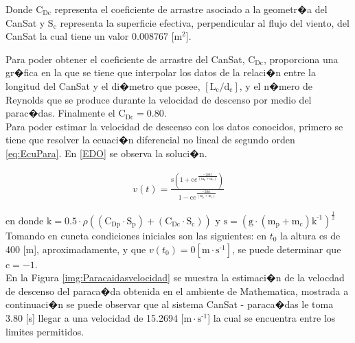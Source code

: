 \documentclass[10pt,a4paper]{book}
\begin{document}
Donde $\text{C}_{\text{Dc}}$ representa el coeficiente de arrastre asociado a la geometr�a del CanSat y $\text{S}_{\text{c}}$ representa la superficie efectiva, perpendicular al flujo del viento, del CanSat la cual tiene un valor 0.008767 [$\text{m}^{\text{2}}$].

Para poder obtener el coeficiente de arrastre del CanSat, $\text{C}_{\text{Dc}}$, \cite{Cilindro} proporciona una gr�fica en la que se tiene que interpolar los datos de la relaci�n entre la longitud del CanSat y el di�metro que posee, $[\text{L}_{\text{c}}/\text{d}_\text{c}]$, y el n�mero de Reynolds que se produce durante la velocidad de descenso por medio del parac�das. Finalmente el $\text{C}_{\text{Dc}} = \text{0.80}$.\\

Para poder estimar la velocidad de descenso con los datos conocidos, primero se tiene que resolver la ecuaci�n diferencial no lineal de segundo orden \eqref{eq:EcuPara}. En \eqref{EDO} se observa la soluci�n. 

\begin{align}
\label{EDO}
v(t) = \frac{\text{s} \left( 1+ \text{c} e^{\frac{-2\text{s}\text{k}t}{(\text{m}_{\text{p}} + \text{m}_{\text{c}})}} \right) }{1-\text{c} e^{\frac{-2\text{sk}t}{( \text{m}_{\text{p}} + \text{m}_{\text{c}} )}} }
\end{align}

en donde $\text{k} = 0{.}5 \cdot \rho ((\text{C}_{\text{Dp}}\cdot \text{S}_{\text{p}}) + (\text{C}_{\text{Dc}} \cdot \text{S}_{\text{c}}))$ y $\text{s} = \left( \text{g} \cdot (\text{m}_{\text{p}} + \text{m}_{\text{c}})\text{k}^{\text{-1}} \right)^{\frac{\text{1}}{\text{2}}}$\\

Tomando en cuneta condiciones iniciales son las siguientes: en $t_{0}$ la altura es de 400 [m], aproximadamente, y que $v(t_{0}) = 0  [\text{m} \cdot \text{s}^{\text{-1}}]$, se puede determinar que $\text{c} = -1$.\\
 
En la Figura \ref{img:Paracaidasvelocidad} se muestra la estimaci�n de la velocdad de descenso del paraca�da obtenida en el ambiente de Mathematica\textregistered , mostrada a continuaci�n se puede observar que al sistema CanSat - paraca�das le toma 3.80 [s] llegar a una velocidad de 15.2694 [$\text{m} \cdot \text{s}^{\text{-1}}$] la cual se encuentra entre los limites permitidos. 
\end{document}
